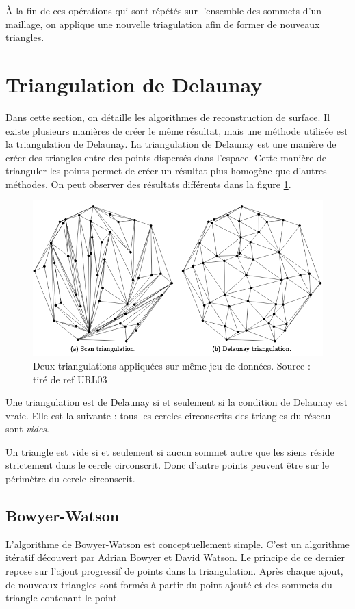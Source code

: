 À la fin de ces opérations qui sont répétés sur l'ensemble des sommets d'un maillage,
on applique une nouvelle triagulation afin de former de nouveaux triangles.

\section{Triangulation de Delaunay}
Dans cette section, on détaille les algorithmes de reconstruction de surface.
Il existe plusieurs manières de créer le même résultat, mais une méthode utilisée est la triangulation de Delaunay.
La triangulation de Delaunay est une manière de créer des triangles entre des points dispersés dans l’espace.
Cette manière de trianguler les points permet de créer un résultat plus homogène que d’autres méthodes.
On peut observer des résultats différents dans la figure
\ref{fig:triangulation_example}.

\begin{figure}[htb!]
    \centering
    \includegraphics[width=0.8\linewidth]{figures/triangulation-example.png}
    \caption{Deux triangulations appliquées sur même jeu de données. Source : tiré de ref URL03}
    \label{fig:triangulation_example}
\end{figure}

Une triangulation est de Delaunay si et seulement si la condition de Delaunay est
vraie. Elle est la suivante : tous les cercles circonscrits des triangles du 
réseau sont \textit{vides}.

Un triangle est vide si et seulement si aucun sommet autre que les siens
réside strictement dans le cercle circonscrit. Donc d'autre points peuvent être
sur le périmètre du cercle circonscrit.

\subsection{Bowyer-Watson}
L'algorithme de Bowyer-Watson est conceptuellement simple.
C'est un algorithme itératif découvert par Adrian Bowyer et David Watson.
Le principe de ce dernier repose sur l’ajout progressif de points dans la triangulation.
Après chaque ajout, de nouveaux triangles sont formés à partir du point ajouté et des sommets du triangle contenant le point.

